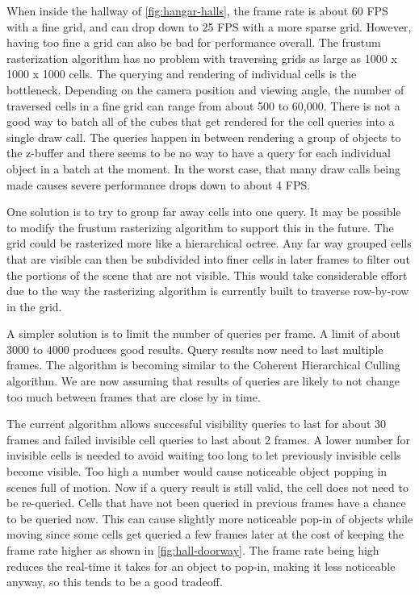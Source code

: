 \documentclass[12pt]{ucthesis}
\begin{document}
When inside the hallway of \ref{fig:hangar-halls}, the frame rate is about 60 FPS with a fine grid, and can drop down to 25 FPS with a more sparse grid.
However, having too fine a grid can also be bad for performance overall.
The frustum rasterization algorithm has no problem with traversing grids as large as 1000 x 1000 x 1000 cells.
The querying and rendering of individual cells is the bottleneck.
Depending on the camera position and viewing angle, the number of traversed cells in a fine grid can range from about 500 to 60,000.
There is not a good way to batch all of the cubes that get rendered for the cell queries into a single draw call.
The queries happen in between rendering a group of objects to the z-buffer and there seems to be no way to have a query for each individual object in a batch at the moment.
In the worst case, that many draw calls being made causes severe performance drops down to about 4 FPS.

One solution is to try to group far away cells into one query.
It may be possible to modify the frustum rasterizing algorithm to support this in the future.
The grid could be rasterized more like a hierarchical octree.
Any far way grouped cells that are visible can then be subdivided into finer cells in later frames to filter out the portions of the scene that are not visible.
This would take considerable effort due to the way the rasterizing algorithm is currently built to traverse row-by-row in the grid.

A simpler solution is to limit the number of queries per frame.
A limit of about 3000 to 4000 produces good results.
Query results now need to last multiple frames.
The algorithm is becoming similar to the Coherent Hierarchical Culling algorithm.\cite{CHC, CHCpp}
We are now assuming that results of queries are likely to not change too much between frames that are close by in time. 

The current algorithm allows successful visibility queries to last for about 30 frames and failed invisible cell queries to last about 2 frames.
A lower number for invisible cells is needed to avoid waiting too long to let previously invisible cells become visible.
Too high a number would cause noticeable object popping in scenes full of motion.
Now if a query result is still valid, the cell does not need to be re-queried.
Cells that have not been queried in previous frames have a chance to be queried now.
This can cause slightly more noticeable pop-in of objects while moving since some cells get queried a few frames later at the cost of keeping the frame rate higher as shown in \ref{fig:hall-doorway}.
The frame rate being high reduces the real-time it takes for an object to pop-in, making it less noticeable anyway, so this tends to be a good tradeoff.
\end{document}
